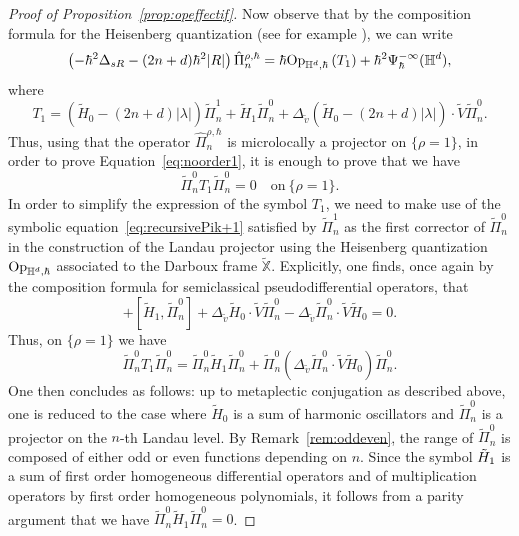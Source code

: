 \documentclass[12pt,a4paper]{amsart}
\theoremstyle{plain}
\theoremstyle{definition}
\theoremstyle{remark}
\numberwithin{equation}{section}
\theoremstyle{definition}
\def \Op{{\rm Op}}
\def \bX{\mathbb{X}}
\def \Heis{\mathbb{H}}
\numberwithin{equation}{section}
\begin{document}
\begin{proof}[Proof of Proposition~\ref{prop:opeffectif}]
    Now observe that by the composition formula for the Heisenberg quantization (see for example \cite[Theorem 5.1]{FM}), we can write
    \begin{equation*}
        \left(-\hbar^2\Delta_{sR} - (2n+d)\hbar^2|R|\right)\hat{\Pi}_n^{\rho,\hbar} = \hbar\Op_{\Heis^d,\hbar}\left(T_1\right) + \hbar^2 \Psi_\hbar^{-\infty}(\Heis^d),
    \end{equation*}
    where 
    \begin{equation*}
        T_1 = (\tilde{H}_0-(2n+d)|\lambda|)\tilde{\Pi}_n^1 + \tilde{H}_1\tilde{\Pi}_n^0 + \Delta_{\tilde{v}} (\tilde{H}_0-(2n+d)|\lambda|) \cdot \tilde{V}\tilde{\Pi}_n^0.
    \end{equation*}
    Thus, using that the operator $\hat{\Pi}_n^{\rho,\hbar}$ is microlocally a projector on $\{\rho=1\}$, in order to prove Equation~\eqref{eq:noorder1}, it is enough to prove that we have
    \begin{equation*}
        \tilde{\Pi}_n^0 T_1 \tilde{\Pi}_n^0 = 0\quad\mbox{on}\  \{\rho=1\}.
    \end{equation*}
    In order to simplify the expression of the symbol $T_1$, we need to make use of the symbolic equation~\eqref{eq:recursivePik+1} satisfied by $\tilde{\Pi}_n^1$ as the first corrector of $\tilde{\Pi}_n^0$ in the construction of the Landau projector using the Heisenberg quantization $\Op_{\Heis^d,\hbar}$ associated to the Darboux frame $\tilde{\bX}$. Explicitly, one finds, once again by the composition formula for semiclassical pseudodifferential operators, that
    \begin{equation*}
        [\tilde{H}_0,\tilde{\Pi}_n^1] + [\tilde{H}_1,\tilde{\Pi}_n^0] + \Delta_{\tilde{v}} \tilde{H}_0\cdot \tilde{V}\tilde{\Pi}_n^0 - \Delta_{\tilde{v}} \tilde{\Pi}_n^0\cdot \tilde{V}\tilde{H}_0 = 0.
    \end{equation*}
    Thus, on $\{\rho=1\}$ we have
    \begin{equation*}
        \tilde{\Pi}_n^0 T_1 \tilde{\Pi}_n^0 = \tilde{\Pi}_n^0\tilde{H}_1 \tilde{\Pi}_n^0 + \tilde{\Pi}_n^0\left(\Delta_{\tilde{v}} \tilde{\Pi}_n^0\cdot \tilde{V}\tilde{H}_0\right) \tilde{\Pi}_n^0.
    \end{equation*}
    One then concludes as follows: up to metaplectic conjugation as described above, one is reduced to the case where $\tilde{H}_0$ is a sum of harmonic oscillators and $\tilde{\Pi}_n^0$ is a projector on the $n$-th Landau level. By Remark~\ref{rem:oddeven}, the range of $\tilde{\Pi}_n^0$ is composed of either odd or even functions depending on $n$. Since the symbol $\Tilde{H}_1$ is a sum of first order homogeneous differential operators and of multiplication operators by first order homogeneous polynomials, it follows from a parity argument that we have $\tilde{\Pi}_n^0\tilde{H}_1 \tilde{\Pi}_n^0 = 0$.

\end{proof}
\end{document}
